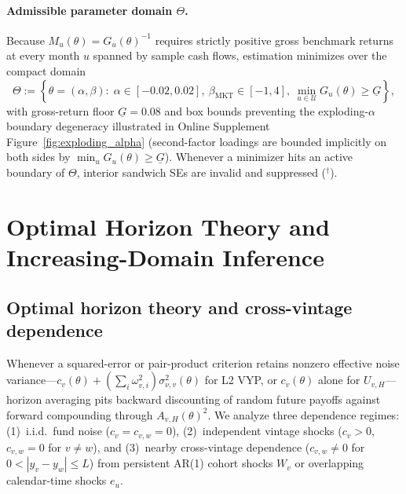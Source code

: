 \documentclass[12pt]{article}
\begin{document}
\paragraph{Admissible parameter domain $\Theta$.}
Because $M_u(\theta) = G_u(\theta)^{-1}$ requires strictly positive gross benchmark returns at every month $u$ spanned by sample cash flows, estimation minimizes over the compact domain
\begin{equation}
\label{eq:admissible_domain}
\Theta := \left\{\theta = (\alpha,\beta) :\; \alpha \in [-0.02, 0.02],\ \beta_{\mathrm{MKT}} \in [-1, 4],\ \min_{u \in \mathcal{U}} G_u(\theta) \ge \underline{G}\right\},
\end{equation}
with gross-return floor $\underline{G} = 0.08$ and box bounds preventing the exploding-$\alpha$ boundary degeneracy \citep[Footnote~8]{DLP12} illustrated in Online Supplement Figure~\ref{fig:exploding_alpha} (second-factor loadings are bounded implicitly on both sides by $\min_u G_u(\theta) \ge \underline{G}$).
Whenever a minimizer hits an active boundary of $\Theta$, interior sandwich SEs are invalid and suppressed ($^{\dagger}$).


\section{Optimal Horizon Theory and Increasing-Domain Inference}
\label{sec:horizon_inference}

\subsection{Optimal horizon theory and cross-vintage dependence}
\label{sec:optimal_H_theory}

Whenever a squared-error or pair-product criterion retains nonzero effective noise variance---$c_v(\theta) + (\sum_i \omega_{v,i}^2)\sigma_{\nu,v}^2(\theta)$ for L2 VYP, or $c_v(\theta)$ alone for $U_{v,H}$---horizon averaging pits backward discounting of random future payoffs against forward compounding through $A_{v,H}(\theta)^2$.
We analyze three dependence regimes: (1)~i.i.d.\ fund noise ($c_v = c_{v,w} = 0$), (2)~independent vintage shocks ($c_v > 0$, $c_{v,w} = 0$ for $v \neq w$), and (3)~nearby cross-vintage dependence ($c_{v,w} \neq 0$ for $0 < |y_v - y_w| \le L$) from persistent AR(1) cohort shocks $W_v$ or overlapping calendar-time shocks $e_u$.
\end{document}

